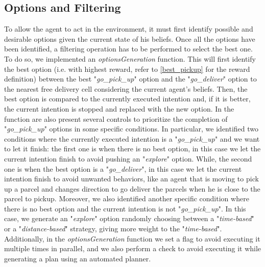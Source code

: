     \subsection{Options and Filtering}
        To allow the agent to act in the environment, it must first identify possible and desirable options given the current state of his beliefs. Once all the options have been identified, a filtering operation has to be performed to select the best one.
        \medskip\\
        To do so, we implemented an \textit{optionsGeneration} function. This will first identify the best option (i.e. with highest reward, refer to \ref{best_pickup} for the reward definition) between the best "\textit{go\_pick\_up}" option and the "\textit{go\_deliver}" option to the nearest free delivery cell considering the current agent's beliefs. Then, the best option is compared to the currently executed intention and, if it is better, the current intention is stopped and replaced with the new option. In the function are also present several controls to prioritize the completion of "\textit{go\_pick\_up}" options in some specific conditions. In particular, we identified two conditions where the currently executed intention is a "\textit{go\_pick\_up}" and we want to let it finish: the first one is when there is no best option, in this case we let the current intention finish to avoid pushing an "\textit{explore}" option. While, the second one is when the best option is a "\textit{go\_deliver}", in this case we let the current intention finish to avoid unwanted behaviors, like an agent that is moving to pick up a parcel and changes direction to go deliver the parcels when he is close to the parcel to pickup. Moreover, we also identified another specific condition where there is no best option and the current intention is not "\textit{go\_pick\_up}". In this case, we generate an "\textit{explore}" option randomly choosing between a "\textit{time-based}" or a "\textit{distance-based}" strategy, giving more weight to the "\textit{time-based}". Additionally, in the \textit{optionsGeneration} function we set a flag to avoid executing it multiple times in parallel, and we also perform a check to avoid executing it while generating a plan using an automated planner.
        
